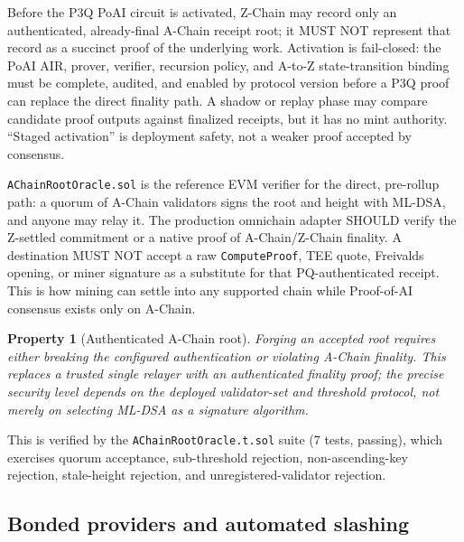 \documentclass[11pt,a4paper]{article}
\newtheorem{property}{Property}
\begin{document}
Before the P3Q PoAI circuit is activated, Z-Chain may record only an authenticated, already-final A-Chain receipt root; it MUST NOT represent that record as a succinct proof of the underlying work. Activation is fail-closed: the PoAI AIR, prover, verifier, recursion policy, and A-to-Z state-transition binding must be complete, audited, and enabled by protocol version before a P3Q proof can replace the direct finality path. A shadow or replay phase may compare candidate proof outputs against finalized receipts, but it has no mint authority. ``Staged activation'' is deployment safety, not a weaker proof accepted by consensus.

\texttt{AChainRootOracle.sol} is the reference EVM verifier for the direct, pre-rollup path: a quorum of A-Chain validators signs the root and height with ML-DSA, and anyone may relay it. The production omnichain adapter SHOULD verify the Z-settled commitment or a native proof of A-Chain/Z-Chain finality. A destination MUST NOT accept a raw \texttt{ComputeProof}, TEE quote, Freivalds opening, or miner signature as a substitute for that PQ-authenticated receipt. This is how mining can settle into any supported chain while Proof-of-AI consensus exists only on A-Chain.

\begin{property}[Authenticated A-Chain root]\label{prop:nation-state}
Forging an accepted root requires either breaking the configured authentication or violating A-Chain finality. This replaces a trusted single relayer with an authenticated finality proof; the precise security level depends on the deployed validator-set and threshold protocol, not merely on selecting ML-DSA as a signature algorithm.
\end{property}

This is verified by the \texttt{AChainRootOracle.t.sol} suite (7 tests, passing), which exercises quorum acceptance, sub-threshold rejection, non-ascending-key rejection, stale-height rejection, and unregistered-validator rejection.

\subsection{Bonded providers and automated slashing}\label{sec:stake}
\end{document}
